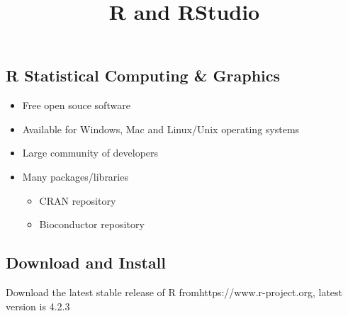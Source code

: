 \documentclass[
  letterpaper,
  DIV=11,
  numbers=noendperiod,
  landscape]{scrartcl}
\title{R and RStudio}
\author{}
\date{}
\providecommand{\tightlist}{%
  \setlength{\itemsep}{0pt}\setlength{\parskip}{0pt}}\usepackage{longtable,booktabs,array}
\begin{document}
\maketitle
\ifdefined\Shaded\renewenvironment{Shaded}{\begin{tcolorbox}[borderline west={3pt}{0pt}{shadecolor}, enhanced, boxrule=0pt, breakable, interior hidden, sharp corners, frame hidden]}{\end{tcolorbox}}\fi

\hypertarget{r-statistical-computing-graphics}{%
\subsection{R Statistical Computing \&
Graphics}\label{r-statistical-computing-graphics}}

\begin{itemize}
\tightlist
\item
  Free open souce software
\item
  Available for Windows, Mac and Linux/Unix operating systems
\item
  Large community of developers
\item
  Many packages/libraries

  \begin{itemize}
  \item
    CRAN repository
  \item
    Bioconductor repository
  \end{itemize}
\end{itemize}

\hypertarget{download-and-install}{%
\subsection{Download and Install}\label{download-and-install}}

Download the latest stable release of R fromhttps://www.r-project.org,
latest version is 4.2.3
\end{document}
